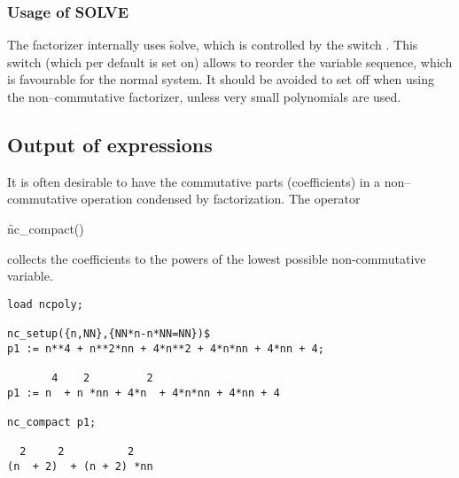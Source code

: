 \subsubsection{Usage of SOLVE}

The factorizer internally uses \f{solve}, which is controlled
by the \REDUCE switch . This switch (which per default
is set on) allows to reorder the variable sequence, which is
favourable for the normal system. It should be avoided to set 
off when using the non--commutative factorizer, unless very small
polynomials are used.

\subsection{Output of expressions}

\hypertarget{operator:NC_COMPACT}{}
It is often desirable to have the commutative parts (coefficients)
in a non--commutative operation condensed by factorization. The operator
\begin{syntax}
   \f{nc\_compact}()
\end{syntax}
collects the coefficients to the powers of the lowest possible
non-commutative variable.
\begin{verbatim}
load ncpoly;

nc_setup({n,NN},{NN*n-n*NN=NN})$
p1 := n**4 + n**2*nn + 4*n**2 + 4*n*nn + 4*nn + 4;

       4    2         2
p1 := n  + n *nn + 4*n  + 4*n*nn + 4*nn + 4

nc_compact p1;

  2     2          2
(n  + 2)  + (n + 2) *nn
\end{verbatim}
